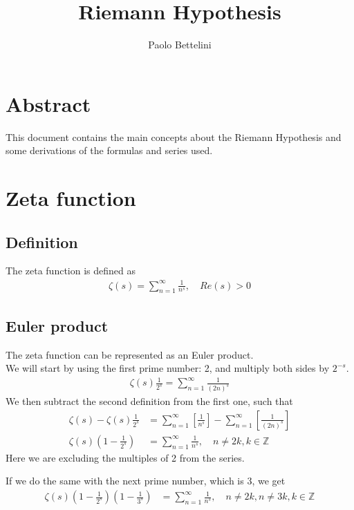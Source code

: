 \documentclass{article}
\title{Riemann Hypothesis}
\author{Paolo Bettelini}
\date{}
\begin{document}
\maketitle

\section*{Abstract}
This document contains the main concepts about the
Riemann Hypothesis and some derivations of the formulas and series used.

\pagebreak

\tableofcontents
\pagebreak

\section{Zeta function}

\subsection{Definition}
The zeta function is defined as
\begin{align*}
    \zeta(s)=\sum_{n=1}^{\infty}\frac{1}{n^s},\quad Re(s)>0
\end{align*}

\subsection{Euler product}
The zeta function can be represented as an Euler product.
\\
We will start by using the first prime number: 2, and multiply both sides by $2^{-s}$.
\begin{align*}
    \zeta(s)\frac{1}{2^s}=\sum_{n=1}^{\infty}\frac{1}{(2n)^s}
\end{align*}
We then subtract the second definition from the first one, such that
\begin{align*}
    \zeta(s)-\zeta(s)\frac{1}{2^s}&=
    \sum_{n=1}^{\infty}\left[\frac{1}{n^s}\right]-
    \sum_{n=1}^{\infty}\left[\frac{1}{(2n)^s}\right]
    \\
    \zeta(s)\left(1-\frac{1}{2^s}\right)&=
    \sum_{n=1}^{\infty}\frac{1}{n^s},
    \quad n\neq 2k,k\in \mathds{Z}
\end{align*}
Here we are excluding the multiples of 2 from the series.

If we do the same with the next prime number, which is 3, we get
\begin{align*}
    \zeta(s)\left(1-\frac{1}{2^s}\right)\left(1-\frac{1}{3^s}\right)&=
    \sum_{n=1}^{\infty}\frac{1}{n^s},
    \quad n\neq 2k,n\neq 3k, k\in \mathds{Z}
\end{align*}
\end{document}
